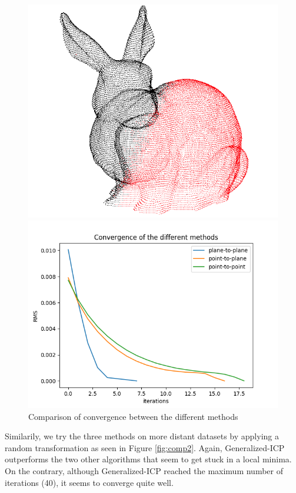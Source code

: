 \documentclass[11pt,letterpaper,leqno]{article}
\begin{document}
\begin{figure}[ht!]
\begin{minipage}{0.45\linewidth}
    \includegraphics[width=\linewidth]{img/conv_1.png}
    \end{minipage}
    \begin{minipage}{0.5\linewidth}
        \includegraphics[width=\linewidth]{img/comparison_1.png}
    \end{minipage}\hfill
    \caption{Comparison of convergence between the different methods}
    \label{fig:comp1}
\end{figure}

Similarily, we try the three methods on more distant datasets by applying a random transformation as seen in Figure \ref{fig:comp2}. Again, Generalized-ICP outperforms the two other algorithms that seem to get stuck in a local minima. On the contrary, although Generalized-ICP reached the maximum number of iterations (40), it seems to converge quite well.
\end{document}
